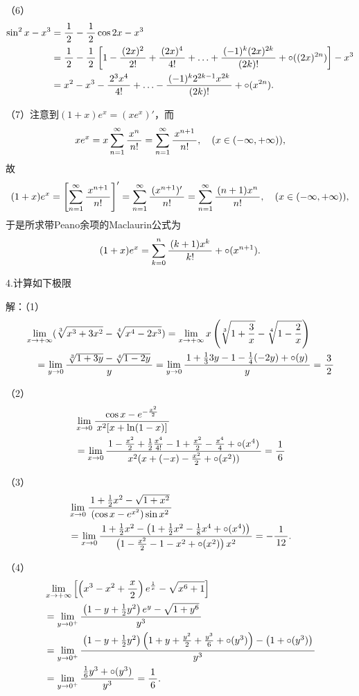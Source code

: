 （6）
\begin{align*}
	\sin^2x-x^3&=\df12-\df12\cos2x-x^3\\
	&=\df12-\df12\left[1-\df{(2x)^2}{2!}+\df{(2x)^4}{4!}
	+\ldots+\df{(-1)^k(2x)^{2k}}{(2k)!}+\circ((2x)^{2n})\right]-x^3\\
	&=x^2-x^3-\df{2^3x^4}{4!}
	+\ldots-\df{(-1)^k2^{2k-1}x^{2k}}{(2k)!}+\circ(x^{2n}).
\end{align*}

（7）注意到$(1+x)e^x=(xe^x)'$，而
$$xe^x=x\sumn\df{x^n}{n!}=\sumn\df{x^{n+1}}{n!},
\quad(x\in(-\infty,+\infty)),$$
故
$$(1+x)e^x=\left[\sumn\df{x^{n+1}}{n!}\right]'
=\sumn\df{(x^{n+1})'}{n!}
=\sumn\df{(n+1)x^n}{n!},
\quad(x\in(-\infty,+\infty)),$$
于是所求带Peano余项的Maclaurin公式为
$$(1+x)e^x=\sum\limits_{k=0}^n\df{(k+1)x^k}{k!}+\circ(x^{n+1}).$$
\fin

\bigskip

4.计算如下极限

解：（1）
\begin{align*}
	&\limx{+\infty}(\sqrt[3]{x^3+3x^2}-\sqrt[4]{x^4-2x^3})
	=\limx{+\infty}x\left(\sqrt[3]{1+\frac3x}
	-\sqrt[4]{1-\frac2x}\right)\\
	&\quad =\lim\limits_{y\to0}\df{\sqrt[3]{1+3y}
	-\sqrt[4]{1-2y}}{y}
	=\lim\limits_{y\to0}\df{1+\frac133y-1-\frac14(-2y)+\circ(y)}y=\df32
\end{align*}

（2）
\begin{align*}
	&\limx0\df{\cos x-e^{-\frac{x^2}2}}{x^2[x+\ln(1-x)]}\\
	&=\limx0\df{1-\frac{x^2}2+\frac12\frac{x^4}{4!}-1+\frac{x^2}2
	-\frac{x^4}{4}+\circ(x^4)}{x^2(x+(-x)-\frac{x^2}2+\circ(x^2))}
	=\df16
\end{align*}

（3）
\begin{align*}
	&\limx0\df{1+\frac12x^2-\sqrt{1+x^2}}{(\cos x-e^{x^2})\sin x^2}\\
	&=\limx0\df{1+\frac12x^2-\left(1+\frac12x^2-\frac18x^4+\circ(x^4)\right)}
	{\left(1-\frac{x^2}2-1-x^2+\circ(x^2)\right)x^2}=-\df1{12}.
\end{align*}

（4）
\begin{align*}
	&\limx{+\infty}\left[\left(x^3-x^2+\df{x}2\right)e^{\frac1x}
	-\sqrt{x^6+1}\right]\\
	&=\lim\limits_{y\to0^+}\df{\left(1-y+\frac12y^2
	\right)e^y-\sqrt{1+y^6}}{y^3}\\
	&=\lim\limits_{y\to0^+}\df{\left(1-y+\frac12y^2
	\right)\left(1+y+\frac{y^2}2+\frac{y^3}6+\circ(y^3)\right)
	-\left(1+\circ(y^3)\right)}{y^3}\\
	&=\lim\limits_{y\to0^+}\df{\frac16y^3+\circ(y^3)}{y^3}=\df16.
\end{align*}


